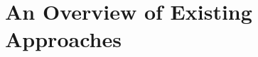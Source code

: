 \makeatother
\EndFmtInput
%

%
\makeatletter

\let\Varid\mathsf
\let\Conid\mathsf






\newcommand{\ty}[1]{\Conid{#1}}
\newcommand{\con}[1]{\Conid{#1}}
\newcommand{\id}[1]{\Varid{#1}}
\newcommand{\cl}[1]{\Varid{#1}}
\newcommand{\opsym}[1]{\mathrel{#1}}

\newcommand\Keyword[1]{\textbf{\textsf{#1}}}
\newcommand\Hide{\mathbin{\downarrow}}
\newcommand\Reveal{\mathbin{\uparrow}}


\makeatother
\EndFmtInput





\section{An Overview of Existing Approaches}
\label{sec:overview}

